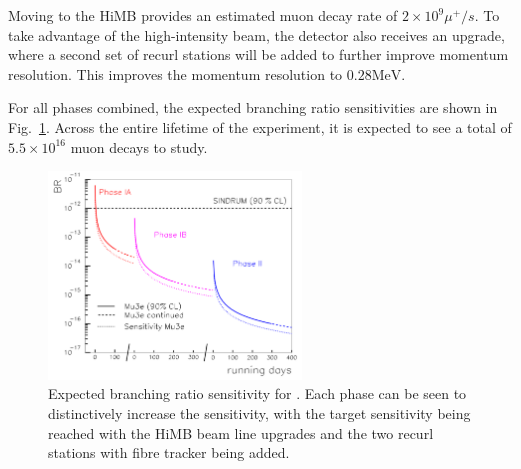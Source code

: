 \noindent Moving to the HiMB provides an estimated muon decay rate of $2 \times 10^9 \mu^+/s$.
To take advantage of the high-intensity beam, the detector also receives an upgrade, where a second set of recurl stations will be added to further improve momentum resolution.
This improves the momentum resolution to $0.28\textrm{MeV}$.

For all phases combined, the expected branching ratio sensitivities are shown in Fig.\ \ref{fig:mu3e_br_limits}.
Across the entire lifetime of the experiment, it is expected to see a total of $5.5 \times 10^{16}$ muon decays to study.

\begin{figure}[h]
    \centering
    \includegraphics[width = 0.6\textwidth]{Figures/experiments/mu3e_br_limits.png}
    \caption{Expected branching ratio sensitivity for \mueee \cite{Blondel:2013ia}.
    Each phase can be seen to distinctively increase the sensitivity, with the target sensitivity being reached with the HiMB beam line upgrades and the two recurl stations with fibre tracker being added.}
    \label{fig:mu3e_br_limits}
\end{figure}
